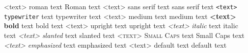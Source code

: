 

\textrm{<text>}       \textrm{roman} text         Roman text
\textsf{<text>}       \textsf{sans serif} text    sans serif text
\texttt{<text>}       \texttt{typewriter} text    typewriter text
\textmd{<text>}       \textmd{medium} text        medium text
\textbf{<text>}       \textbf{bold} text          bold text
\textup{<text>}       \textup{upright} text       upright text
\textit{<text>}       \textit{italic} text        italic text
\textsl{<text>}       \textsl{slanted} text       slanted text
\textsc{<text>}       \textsc{Small Caps} text    Small Caps text
\emph{<text>}         \emph{emphasized} text      emphasized text
\textnormal{<text>}   \textnormal{default} text   default text
